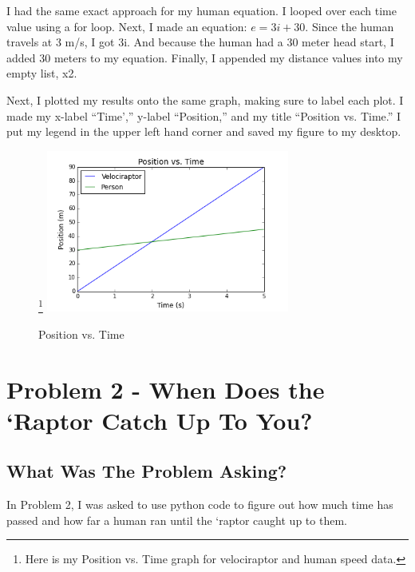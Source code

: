 \documentclass[twocolumn]{revtex4}
\begin{document}
I had the same exact approach for my human equation. I looped over each time value using a for loop. Next, I made an equation: $e = 3i+30.$ Since the human travels at 3 m/s, I got 3i. And because the human had a 30 meter head start, I added 30 meters to my equation. Finally, I appended my distance values into my empty list, x2.

Next, I plotted my results onto the same graph, making sure to label each plot. I made my x-label ``Time','' y-label ``Position,'' and my title ``Position vs. Time.'' I put my legend in the upper left hand corner and saved my figure to my desktop. 

\graphicspath{ {Desktop/CSIS_200_F15/} }
\begin{figure}[h]
\caption{Position vs. Time}
\footnote{Here is my Position vs. Time graph for velociraptor and human speed data.\label{fig:posvs.time}}
\includegraphics[width=8cm]{Position_vs_Time}
\end{figure}


\section{Problem 2 - When Does the `Raptor Catch Up To You?}
\subsection{What Was The Problem Asking?}
In Problem 2, I was asked to use python code to figure out how much time has passed and how far a human ran until the `raptor caught up to them.
\end{document}
